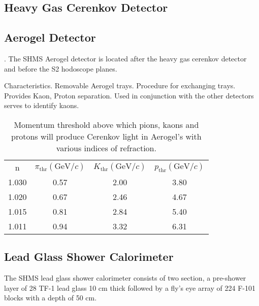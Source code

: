 \subsection{Heavy Gas Cerenkov Detector}

\subsection{Aerogel Detector}
.
The SHMS Aerogel detector is located after the heavy gas cerenkov
detector and before the S2 hodoscope planes.

Characteristics.  Removable Aerogel trays.  Procedure for exchanging
trays.  Provides Kaon, Proton separation. Used in conjunction with the
other detectors serves to identify kaons.

\begin{table}
\caption{Momentum threshold above which pions, kaons and protons will 
produce Cerenkov light in Aerogel's with various indices of refraction.
\label{tab:shms_aerogel}}
\begin{center}
\begin{tabular}{cccc}
  n& $\pi_{\textrm{thr}}(\textrm{GeV}/c)$ & $K_{\textrm{
  thr}}(\textrm{GeV}/c)$ & $p_{\textrm{thr}}(\textrm{GeV}/c)$\\
  1.030 & 0.57 & 2.00 & 3.80 \\
  1.020 & 0.67 & 2.46 & 4.67 \\
  1.015 & 0.81 & 2.84 & 5.40 \\
  1.011 & 0.94 & 3.32 & 6.31 \\
\end{tabular}
\end{center}
\end{table}



\subsection{Lead Glass Shower Calorimeter}

The SHMS lead glass shower calorimeter consists of two section, a
pre-shower layer of 28 TF-1 lead glass 10 cm thick followed by a fly's eye
array of 224 F-101 blocks with a depth of 50 cm.



